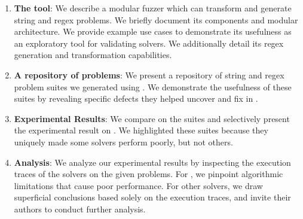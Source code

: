         \begin{enumerate}
            \item \textbf{The \fuzzer{} tool}: We describe a modular fuzzer which can transform and generate \smtfull{} string and regex problems. We briefly document its components and modular architecture. We provide example use cases to demonstrate its usefulness as an exploratory tool for validating solvers. We additionally detail its regex generation and transformation capabilities.
            \item \textbf{A repository of \smtfull{} problems}: We present a repository of \smtfull{} string and regex problem suites we generated using \fuzzer{}. We demonstrate the usefulness of these suites by revealing specific defects they helped uncover and fix in \us{}.
            \item \textbf{Experimental Results}: We compare \theSolvers{} on the \fuzzer{} suites and selectively present the experimental result on \theSuites{}. We highlighted these suites because they uniquely made some solvers perform poorly, but not others.
            \item \textbf{Analysis}: We analyze our experimental results by inspecting the execution traces of the solvers on the given problems. For \us{}, we pinpoint algorithmic limitations that cause poor performance. For other solvers, we draw superficial conclusions based solely on the execution traces, and invite their authors to conduct further analysis.
        \end{enumerate}

